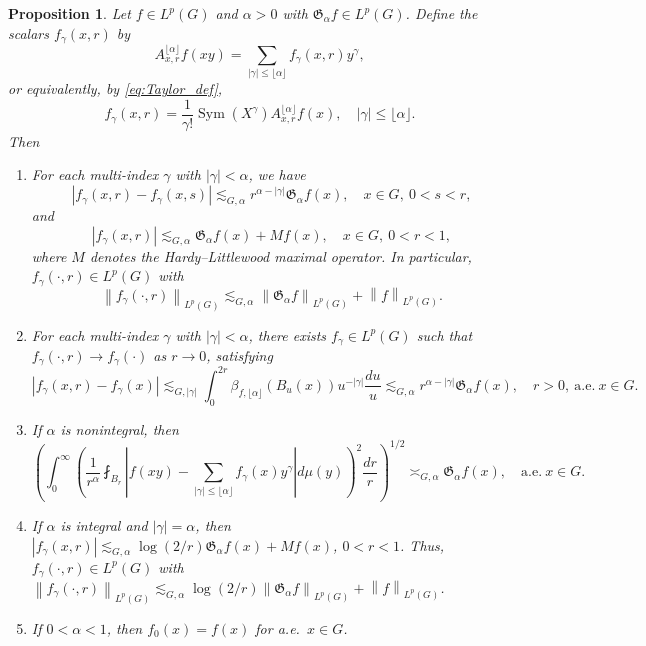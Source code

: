 \documentclass[11pt,reqno]{amsart}
\newtheorem{proposition}[theorem]{Proposition}
\newcommand{\1}{\mathbf 1}
\begin{document}
\begin{proposition}\label{prop:measurableTaylor}
Let $f\in L^p\left(G\right)$ and $\alpha>0$ with $\mathfrak{G}_\alpha f\in L^p\left(G\right)$. Define the scalars $f_\gamma\left(x,r\right)$ by
\[
A^{\lfloor\alpha\rfloor}_{x,r}f\left(xy\right)=\sum_{\left|\gamma\right|\le \lfloor \alpha \rfloor} f_\gamma\left(x,r\right)y^\gamma,
\]
or equivalently, by \eqref{eq:Taylor_def},
\begin{equation}\label{eq:taylor_f_gamma}
    f_\gamma\left(x,r\right)=\frac{1}{\gamma!}\operatorname{Sym}\left(X^\gamma\right)A^{\lfloor\alpha\rfloor}_{x,r}f\left(x\right),\quad \left|\gamma\right|\le \lfloor\alpha\rfloor.
\end{equation}
Then

\begin{enumerate}
    \item For each multi-index $\gamma$ with $\left|\gamma\right|<\alpha$, we have
\[
\left|f_\gamma \left(x,r\right)-f_\gamma\left(x,s\right)\right|\lesssim_{G,\alpha}r^{\alpha-\left|\gamma\right|}\mathfrak{G}_\alpha f\left(x\right),\quad x\in G,~0<s<r,
\]
and
\[
\left|f_\gamma\left(x,r\right)\right|\lesssim_{G,\alpha} \mathfrak{G}_\alpha f\left(x\right)+Mf\left(x\right),\quad x\in G,~0<r<1,
\]
where $M$ denotes the Hardy--Littlewood maximal operator. In particular, $f_\gamma\left(\cdot,r\right)\in L^p\left(G\right)$ with
\[
\left\|f_\gamma\left(\cdot,r\right)\right\|_{L^p\left(G\right)}\lesssim_{G,\alpha} \left\|\mathfrak{G}_\alpha f\right\|_{L^p\left(G\right)}+\left\|f\right\|_{L^p\left(G\right)}.
\]
    \item For each multi-index $\gamma$ with $\left|\gamma\right|<\alpha$, there exists $f_\gamma\in L^p\left(G\right)$ such that $f_\gamma\left(\cdot,r\right)\to f_\gamma\left(\cdot\right)$ as $r\to 0$, satisfying
    \[
    \left|f_\gamma \left(x,r\right)-f_\gamma\left(x\right)\right|\lesssim_{G,\left|\gamma\right|} \int_{0}^{2r} \beta_{f,\lfloor\alpha\rfloor}\left(B_u\left(x\right)\right)u^{-\left|\gamma\right|}\frac{du}{u}\lesssim_{G,\alpha}r^{\alpha-\left|\gamma\right|}\mathfrak{G}_\alpha f\left(x\right), \quad r>0,~\mathrm{a.e.~}x\in G.
    \]
    \item If $\alpha$ is nonintegral, then
    \[
\left(\int_0^\infty \left(\frac{1}{r^\alpha}\fint_{B_r}\left|f\left(xy\right)-\sum_{\left|\gamma\right|\le \lfloor \alpha \rfloor} f_\gamma\left(x\right)y^\gamma\right|d\mu\left(y\right)\right)^2 \frac{dr}r\right)^{1/2}\asymp_{G,\alpha} \mathfrak{G}_\alpha f\left(x\right), \quad \mathrm{a.e.~}x\in G.
\]
    \item If $\alpha$ is integral and $\left|\gamma\right|=\alpha$, then $\left|f_\gamma\left(x,r\right)\right|\lesssim_{G,\alpha} \log \left(2/r\right)\mathfrak{G}_\alpha f\left(x\right)+Mf\left(x\right)$, $0<r<1$. Thus, $f_\gamma\left(\cdot,r\right)\in L^p\left(G\right)$ with $\left\|f_\gamma\left(\cdot,r\right)\right\|_{L^p\left(G\right)}\lesssim_{G,\alpha} \log\left(2/r\right)\left\|\mathfrak{G}_\alpha f\right\|_{L^p\left(G\right)}+\left\|f\right\|_{L^p\left(G\right)}$.
    \item If $0<\alpha<1$, then $f_0\left(x\right)=f\left(x\right)$ for a.e.~$x\in G$.
\end{enumerate}

\end{proposition}
\end{document}
